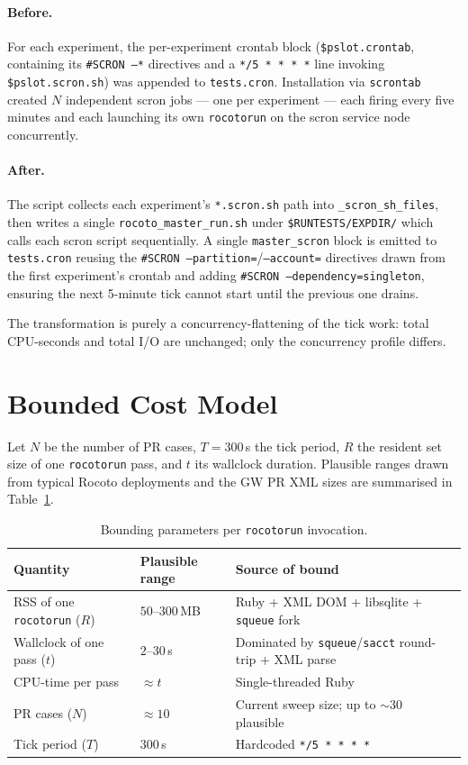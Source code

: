 \documentclass[11pt]{article}
\newcommand{\code}[1]{\texttt{#1}}
\begin{document}
\paragraph{Before.}
For each experiment, the per-experiment crontab block
(\code{\${pslot}.crontab}, containing its \code{\#SCRON --*} directives
and a \code{*/5 * * * *} line invoking \code{\${pslot}.scron.sh}) was
appended to \code{tests.cron}. Installation via \code{scrontab}
created $N$ independent scron jobs --- one per experiment --- each
firing every five minutes and each launching its own \code{rocotorun}
on the scron service node concurrently.

\paragraph{After.}
The script collects each experiment's \code{*.scron.sh} path into
\code{\_scron\_sh\_files}, then writes a single
\code{rocoto\_master\_run.sh} under \code{\${RUNTESTS}/EXPDIR/} which
calls each scron script sequentially. A single
\code{master\_scron} block is emitted to \code{tests.cron} reusing the
\code{\#SCRON --partition=}/\code{--account=} directives drawn from the
first experiment's crontab and adding
\code{\#SCRON --dependency=singleton}, ensuring the next 5-minute tick
cannot start until the previous one drains.

The transformation is purely a concurrency-flattening of the tick
work: total CPU-seconds and total I/O are unchanged; only the
concurrency profile differs.

\section{Bounded Cost Model}
\label{sec:bounds}

Let $N$ be the number of PR cases, $T = 300$\,s the tick period, $R$
the resident set size of one \code{rocotorun} pass, and $t$ its
wallclock duration. Plausible ranges drawn from typical Rocoto
deployments and the GW PR XML sizes are summarised in
Table~\ref{tab:bounds}.

\begin{table}[h]
\centering
\caption{Bounding parameters per \code{rocotorun} invocation.}
\label{tab:bounds}
\begin{tabular}{lll}
\toprule
Quantity & Plausible range & Source of bound \\
\midrule
RSS of one \code{rocotorun} ($R$) & $50$--$300$\,MB &
  Ruby + XML DOM + libsqlite + \code{squeue} fork \\
Wallclock of one pass ($t$)       & $2$--$30$\,s &
  Dominated by \code{squeue}/\code{sacct} round-trip + XML parse \\
CPU-time per pass                  & $\approx t$ &
  Single-threaded Ruby \\
PR cases ($N$)                    & $\approx 10$ &
  Current sweep size; up to $\sim 30$ plausible \\
Tick period ($T$)                 & $300$\,s &
  Hardcoded \code{*/5 * * * *} \\
\bottomrule
\end{tabular}
\end{table}
\end{document}
